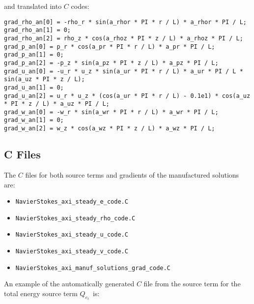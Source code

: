 \documentclass[10pt]{article}
\begin{document}
 and translated into $C$ codes:
\begin{small}
 \begin{verbatim}
grad_rho_an[0] = -rho_r * sin(a_rhor * PI * r / L) * a_rhor * PI / L;
grad_rho_an[1] = 0;
grad_rho_an[2] = rho_z * cos(a_rhoz * PI * z / L) * a_rhoz * PI / L;
grad_p_an[0] = p_r * cos(a_pr * PI * r / L) * a_pr * PI / L;
grad_p_an[1] = 0;
grad_p_an[2] = -p_z * sin(a_pz * PI * z / L) * a_pz * PI / L;
grad_u_an[0] = -u_r * u_z * sin(a_ur * PI * r / L) * a_ur * PI / L * sin(a_uz * PI * z / L);
grad_u_an[1] = 0;
grad_u_an[2] = u_r * u_z * (cos(a_ur * PI * r / L) - 0.1e1) * cos(a_uz * PI * z / L) * a_uz * PI / L;
grad_w_an[0] = -w_r * sin(a_wr * PI * r / L) * a_wr * PI / L;
grad_w_an[1] = 0;
grad_w_an[2] = w_z * cos(a_wz * PI * z / L) * a_wz * PI / L;
\end{verbatim}
\end{small}



\subsection{C Files}
The $C$ files for both source terms and gradients of the  manufactured solutions are:
\begin{itemize}
\item \texttt{NavierStokes\_axi\_steady\_e\_code.C}
 \item \texttt{NavierStokes\_axi\_steady\_rho\_code.C}
 \item \texttt{NavierStokes\_axi\_steady\_u\_code.C}
 \item \texttt{NavierStokes\_axi\_steady\_v\_code.C}
 \item \texttt{NavierStokes\_axi\_manuf\_solutions\_grad\_code.C}
\end{itemize}

An example of the automatically generated $C$ file from the source term for the total energy source term $Q_{e_t}$~is:
\end{document}
